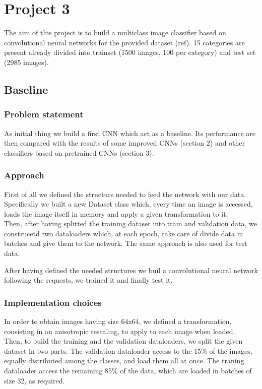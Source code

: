 \documentclass[12pt, a4paper]{report}
\begin{document}
\chapter*{Project 3}
		
The aim of this project is to build a multiclass image classifier based on convolutional neural networks for the provided dataset (ref). 15 categories are present already divided into trainset (1500 images, 100 per category) and test set (2985 images).
	
	
\section{Baseline}
\subsection*{Problem statement}
	
As initial thing we build a first CNN which act as a baseline. Its performance are then compared with the results of some improved CNNs (section 2) and other classifiers based on pretrained CNNs (section 3).
	
\subsection*{Approach}

First of all we  defined the structurs needed to feed the network with our data.\\
Specifically we built a new Dataset class which, every time an image is accessed, loads the image itself in memory and apply a given transformation to it.\\
Then, after having splitted the training dataset into train and validation data, we construcetd two dataloaders which, at each epoch, take care of divide data in batches and give them to the network. The same approach is also used for test data.

After having defined the needed structures we buil a convolutional neural network following the requests, we trained it and finally test it.
	
\subsection*{Implementation choices}

In order to obtain images having size 64x64, we defined a transformation, consisting in an anisotropic rescaling, to apply to each image when loaded.\\
Then, to build the training and the validation dataloaders, we split the given dataset in two parts. The validation dataloader access to the 15\% of the images, equally distributed among the classes, and load them all at once. The traning dataloader access the remaining 85\% of the data, which are loaded in batches of size 32, as required.
\end{document}
